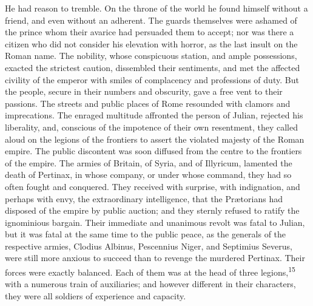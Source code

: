 
He had reason to tremble. On the throne of the world he found
himself without a friend, and even without an adherent. The
guards themselves were ashamed of the prince whom their avarice
had persuaded them to accept; nor was there a citizen who did not
consider his elevation with horror, as the last insult on the
Roman name. The nobility, whose conspicuous station, and ample
possessions, exacted the strictest caution, dissembled their
sentiments, and met the affected civility of the emperor with
smiles of complacency and professions of duty. But the people,
secure in their numbers and obscurity, gave a free vent to their
passions. The streets and public places of Rome resounded with
clamors and imprecations. The enraged multitude affronted the
person of Julian, rejected his liberality, and, conscious of the
impotence of their own resentment, they called aloud on the
legions of the frontiers to assert the violated majesty of the
Roman empire. The public discontent was soon diffused from the
centre to the frontiers of the empire. The armies of Britain, of
Syria, and of Illyricum, lamented the death of Pertinax, in whose
company, or under whose command, they had so often fought and
conquered. They received with surprise, with indignation, and
perhaps with envy, the extraordinary intelligence, that the
Prætorians had disposed of the empire by public auction; and they
sternly refused to ratify the ignominious bargain. Their
immediate and unanimous revolt was fatal to Julian, but it was
fatal at the same time to the public peace, as the generals of
the respective armies, Clodius Albinus, Pescennius Niger, and
Septimius Severus, were still more anxious to succeed than to
revenge the murdered Pertinax. Their forces were exactly
balanced. Each of them was at the head of three legions,\textsuperscript{15} with
a numerous train of auxiliaries; and however different in their
characters, they were all soldiers of experience and capacity.


